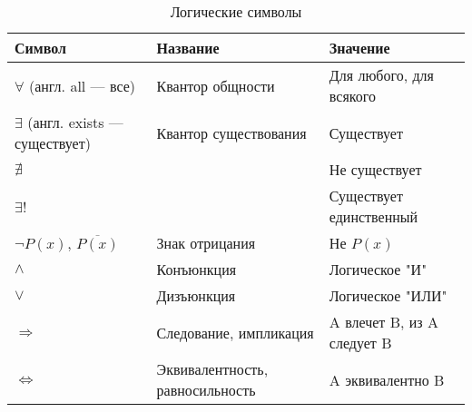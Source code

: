 \begin{table}[H]
  \centering
  \begin{tabular}{ |l|l|l| }
    \hline
    \textbf{Символ} & \textbf{Название} & \textbf{Значение} \\ 
    \hline
    \hline
    $\forall$ (англ. all --- все) & Квантор общности & Для любого, для всякого \\  
    \hline
    $\exists$ (англ. exists --- существует) & Квантор существования & Существует \\  
    \hline
    $\nexists$ &  & Не существует \\
    \hline
    $\exists$! &  & Существует единственный \\
    \hline
    $\neg P(x)$, $\overline{P(x)}$ & Знак отрицания & Не $P(x)$ \\
    \hline
    $\wedge$ & Конъюнкция & Логическое "И" \\
    \hline
    $\vee$ & Дизъюнкция & Логическое "ИЛИ" \\
    \hline
    $\Rightarrow$ & Следование, импликация & A влечет B, из A следует B  \\
    \hline
    $\Leftrightarrow$ & Эквивалентность, равносильность & A эквивалентно  B\\
    \hline
  \end{tabular}
  \caption{Логические символы}
  \label{table:quantors_explained}
\end{table}

